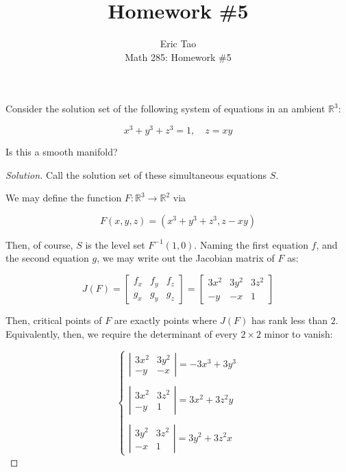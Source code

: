 \documentclass[10pt]{article}
\newenvironment{problem}[2][]{\begin{trivlist}
\item[\hskip \labelsep {\bfseries #1}\hskip \labelsep {\bfseries #2.}]}{\end{trivlist}}
\begin{document}
 
\title{Homework \#5}
\author{Eric Tao\\
Math 285: Homework \#5}
\maketitle

\begin{problem}{Question 1}

Consider the solution set of the following system of equations in an ambient $\mathbb{R}^3$:

$$ x^3 + y^3 + z^3 = 1, \quad z = xy $$

Is this a smooth manifold?

\end{problem}

\begin{proof}[Solution]

Call the solution set of these simultaneous equations $S$. 

We may define the function $F: \mathbb{R}^3 \to \mathbb{R}^2$ via

$$ F(x,y,z) = (x^3 + y^3 + z^3, z - xy) $$

Then, of course, $S$ is the level set $F^{-1}(1,0)$. Naming the first equation $f$, and the second equation $g$, we may write out the Jacobian matrix of $F$ as:

$$ J(F) = \begin{bmatrix} f_x & f_y& f_z \\ g_x & g_y & g_z \end{bmatrix} = \begin{bmatrix} 3x^2 & 3y^2& 3z^2 \\ -y & -x & 1 \end{bmatrix} $$

Then, critical points of $F$ are exactly points where $J(F)$ has rank less than $2$. Equivalently, then, we require the determinant of every $2 \times 2$ minor to vanish:

$$ \begin{cases} \left| \begin{array}{cc} 3x^2 & 3y^2 \\ -y & -x \end{array} \right| = -3x^3 + 3y^3 \\ \\ \left| \begin{array}{cc} 3x^2 & 3z^2 \\ -y & 1 \end{array} \right| = 3x^2 + 3z^2y \\ \\  \left| \begin{array}{cc} 3y^2 & 3z^2 \\ -x & 1 \end{array} \right| = 3y^2 + 3z^2x \end{cases}$$


\end{proof}
\end{document}
